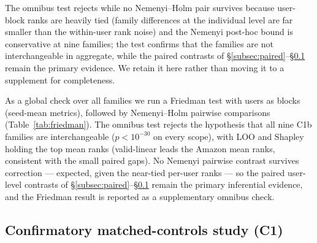 \documentclass[pdflatex,sn-mathphys-num]{sn-jnl}
\begin{document}
The omnibus test rejects while no Nemenyi--Holm pair survives because user-block ranks are heavily tied (family differences at the individual level are far smaller than the within-user rank noise) and the Nemenyi post-hoc bound is conservative at nine families; the test confirms that the families are not interchangeable in aggregate, while the paired contrasts of \S\ref{subsec:paired}--\S\ref{subsec:c1} remain the primary evidence. We retain it here rather than moving it to a supplement for completeness.

As a global check over all families we run a Friedman test with users as blocks (seed-mean metrics), followed by Nemenyi--Holm pairwise comparisons (Table~\ref{tab:friedman}). The omnibus test rejects the hypothesis that all nine C1b families are interchangeable ($p<10^{-30}$ on every scope), with LOO and Shapley holding the top mean ranks (valid-linear leads the Amazon mean ranks, consistent with the small paired gaps). No Nemenyi pairwise contrast survives correction --- expected, given the near-tied per-user ranks --- so the paired user-level contrasts of \S\ref{subsec:paired}--\S\ref{subsec:c1} remain the primary inferential evidence, and the Friedman result is reported as a supplementary omnibus check.

\begin{table}[t]
\caption{Friedman omnibus test over all nine C1b families with users as blocks (seed-mean metric per user), Nemenyi--Holm post-hoc.}\label{tab:friedman}
\centering
\scriptsize
{}
\end{table}

\subsection{Confirmatory matched-controls study (C1)}\label{subsec:c1}
\end{document}
